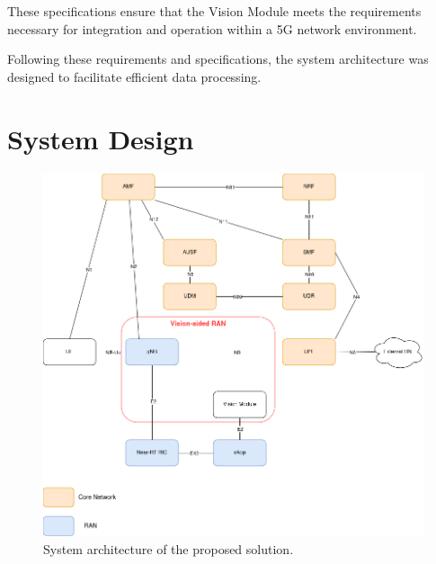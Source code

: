 \begin{table}[H]
\caption{System specifications.}
\label{tab:spec}
\centering
{}
\end{table}

These specifications ensure that the Vision Module meets the requirements necessary for integration and operation within a 5G network environment.


Following these requirements and specifications, the system architecture was designed to facilitate efficient data processing.

\section{System Design}\label{sec:design}

\begin{figure}[H]
    \centering
    \includegraphics[width=0.7\linewidth]{figures/Syst_Arch.drawio}
    \caption[System architecture of the proposed solution]{System architecture of the proposed solution.}
    \label{fig:my_arch}
\end{figure}

